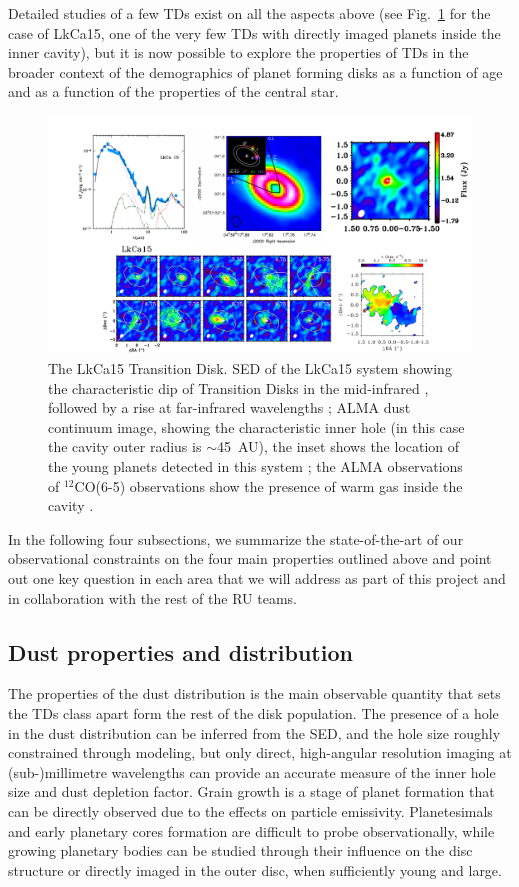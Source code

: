 \documentclass[10pt,fleqn,twoside]{article}
\begin{document}
Detailed studies of a few TDs exist on all the aspects above (see Fig.~\ref{f_examples} for the case of LkCa15, one of the very few TDs with directly imaged planets inside the inner cavity), but it is now possible to explore the properties of TDs in the broader context of the demographics of planet forming disks as a function of age and as a function of the properties of the central star.  
\begin{figure}
\centerline{\includegraphics[scale=0.5]{Figure_LkCa15.pdf}}
\caption{The LkCa15 Transition Disk.  SED of the LkCa15 system showing the characteristic dip
  of Transition Disks in the mid-infrared , followed by a rise at
  far-infrared wavelengths \citep{2011ApJ...728...49E}; ALMA dust continuum
  image, showing the characteristic inner hole (in this case the cavity
  outer radius is $\sim$45~AU), the inset shows the location of the young
  planets detected in this system \citep{2015Natur.527..342S}; the ALMA
  observations of $^{12}$CO(6-5) observations show the presence of warm gas
  inside the cavity \citep{2015A&A...579A.106V}.}
\label{f_examples}
\end{figure}

In the following four subsections, we summarize the state-of-the-art of our observational constraints on the four main properties outlined above and point out one key question in each area that we will address as part of this project and in collaboration with the rest of the RU teams.

\subsection{Dust properties and distribution} 
The properties of the dust distribution is the main observable quantity that sets the TDs class apart form the rest of the disk population. The presence of a hole in the dust distribution can be inferred from the SED, and the hole size roughly constrained through modeling, but only direct, high-angular resolution imaging at (sub-)millimetre wavelengths can provide an accurate measure of the inner hole size and dust depletion factor.
Grain growth is a stage of planet formation that can be directly observed due to the effects on particle emissivity. Planetesimals and early planetary cores formation are difficult to probe observationally, while growing planetary bodies can be studied through their influence on the disc structure or directly imaged in the outer disc, when sufficiently young and large.
\end{document}
